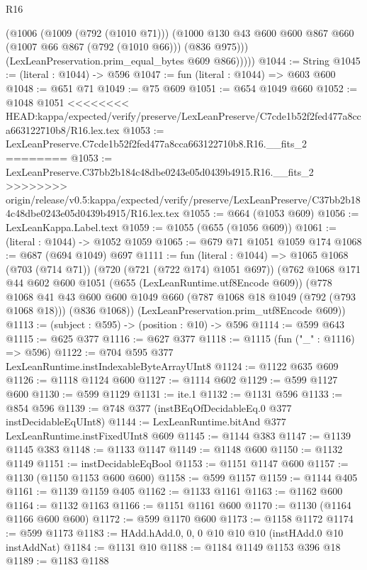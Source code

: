 \begin{lexlean}{R16}
\begin{coremodule}
{{{{{{{{{{{{{{{{{            (@1006
              (@1009 (@792 (@1010 @71)))
              (@1000 @130 @43 @600 @600 @867 @660 (@1007 @66 @867 (@792 (@1010 @66))) (@836 @975)))
            (LexLeanPreservation.prim_equal_bytes @609 @866)))))
@1044 := String
@1045 := (literal : @1044) -> @596
@1047 := fun (literal : @1044) => @603 @600
@1048 := @651 @71
@1049 := @75 @609
@1051 := @654 @1049 @660
@1052 := @1048 @1051
<<<<<<<< HEAD:kappa/expected/verify/preserve/LexLeanPreserve/C7cde1b52f2fed477a8cca663122710b8/R16.lex.tex
@1053 := LexLeanPreserve.C7cde1b52f2fed477a8cca663122710b8.R16.__fits_2
========
@1053 := LexLeanPreserve.C37bb2b184c48dbe0243e05d0439b4915.R16.__fits_2
>>>>>>>> origin/release/v0.5:kappa/expected/verify/preserve/LexLeanPreserve/C37bb2b184c48dbe0243e05d0439b4915/R16.lex.tex
@1055 := @664 (@1053 @609)
@1056 := LexLeanKappa.Label.text
@1059 := @1055 (@655 (@1056 @609))
@1061 := (literal : @1044) -> @1052 @1059
@1065 := @679 @71 @1051 @1059 @174
@1068 := @687 (@694 @1049) @697
@1111 := fun (literal : @1044) =>
  @1065
    @1068
    (@703 (@714 @71))
    (@720 (@721 (@722 @174) @1051 @697))
    (@762
      @1068
      @171
      @44
      @602
      @600
      @1051
      (@655 (LexLeanRuntime.utf8Encode @609))
      (@778
        @1068
        @41
        @43
        @600
        @600
        @1049
        @660
        (@787 @1068 @18 @1049 (@792 (@793 @1068 @18)))
        (@836 @1068))
      (LexLeanPreservation.prim_utf8Encode @609))
@1113 := (subject : @595) -> (position : @10) -> @596
@1114 := @599 @643
@1115 := @625 @377
@1116 := @627 @377
@1118 := @1115 (fun ("_" : @1116) => @596)
@1122 := @704 @595 @377 LexLeanRuntime.instIndexableByteArrayUInt8
@1124 := @1122 @635 @609
@1126 := @1118 @1124 @600
@1127 := @1114 @602
@1129 := @599 @1127 @600
@1130 := @599 @1129
@1131 := ite.{1}
@1132 := @1131 @596
@1133 := @854 @596
@1139 := @748 @377 (instBEqOfDecidableEq.{0} @377 instDecidableEqUInt8)
@1144 := LexLeanRuntime.bitAnd @377 LexLeanRuntime.instFixedUInt8 @609
@1145 := @1144 @383
@1147 := @1139 @1145 @383
@1148 := @1133 @1147
@1149 := @1148 @600
@1150 := @1132 @1149
@1151 := instDecidableEqBool
@1153 := @1151 @1147 @600
@1157 := @1130 (@1150 @1153 @600 @600)
@1158 := @599 @1157
@1159 := @1144 @405
@1161 := @1139 @1159 @405
@1162 := @1133 @1161
@1163 := @1162 @600
@1164 := @1132 @1163
@1166 := @1151 @1161 @600
@1170 := @1130 (@1164 @1166 @600 @600)
@1172 := @599 @1170 @600
@1173 := @1158 @1172
@1174 := @599 @1173
@1183 := HAdd.hAdd.{0, 0, 0} @10 @10 @10 (instHAdd.{0} @10 instAddNat)
@1184 := @1131 @10
@1188 := @1184 @1149 @1153 @396 @18
@1189 := @1183 @1188
}}}}}}}}}}}}}}}}}
\end{coremodule}
\end{lexlean}
